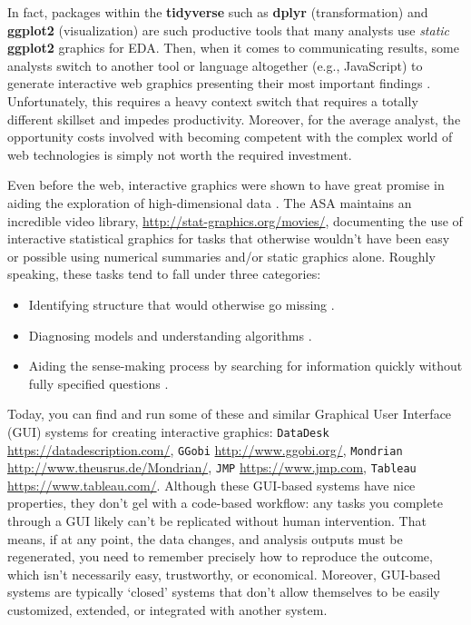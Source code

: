 \documentclass[
  12pt,
]{krantz}
\providecommand{\tightlist}{%
  \setlength{\itemsep}{0pt}\setlength{\parskip}{0pt}}
\begin{document}
In fact, packages within the \textbf{tidyverse} such as \textbf{dplyr} (transformation) and \textbf{ggplot2} (visualization) are such productive tools that many analysts use \emph{static} \textbf{ggplot2} graphics for EDA. Then, when it comes to communicating results, some analysts switch to another tool or language altogether (e.g., JavaScript) to generate interactive web graphics presenting their most important findings \citep{flowingdata-r, nyt-r}. Unfortunately, this requires a heavy context switch that requires a totally different skillset and impedes productivity. Moreover, for the average analyst, the opportunity costs involved with becoming competent with the complex world of web technologies is simply not worth the required investment.

Even before the web, interactive graphics were shown to have great promise in aiding the exploration of high-dimensional data \citep{Cook:2007uk}. The ASA maintains an incredible video library, \url{http://stat-graphics.org/movies/}, documenting the use of interactive statistical graphics for tasks that otherwise wouldn't have been easy or possible using numerical summaries and/or static graphics alone. Roughly speaking, these tasks tend to fall under three categories:

\begin{itemize}
\tightlist
\item
  Identifying structure that would otherwise go missing \citep{prim9}.
\item
  Diagnosing models and understanding algorithms \citep{model-vis-paper}.
\item
  Aiding the sense-making process by searching for information quickly without fully specified questions \citep{Unwin:1999vp}.
\end{itemize}

Today, you can find and run some of these and similar Graphical User Interface (GUI) systems for creating interactive graphics: \texttt{DataDesk} \url{https://datadescription.com/}, \texttt{GGobi} \url{http://www.ggobi.org/}, \texttt{Mondrian} \url{http://www.theusrus.de/Mondrian/}, \texttt{JMP} \url{https://www.jmp.com}, \texttt{Tableau} \url{https://www.tableau.com/}. Although these GUI-based systems have nice properties, they don't gel with a code-based workflow: any tasks you complete through a GUI likely can't be replicated without human intervention. That means, if at any point, the data changes, and analysis outputs must be regenerated, you need to remember precisely how to reproduce the outcome, which isn't necessarily easy, trustworthy, or economical. Moreover, GUI-based systems are typically `closed' systems that don't allow themselves to be easily customized, extended, or integrated with another system.
\end{document}
